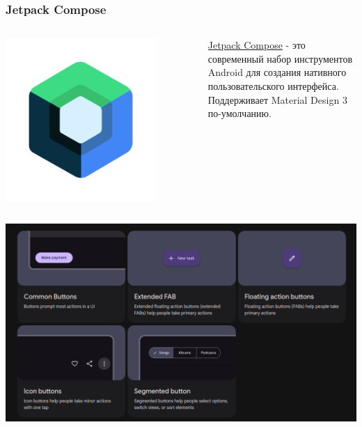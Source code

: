 \documentclass[12pt]{beamer}
\begin{document}
\begin{frame}
\begin{columns}
\begin{column}{0.5\textwidth}
            \end{column}
        \end{columns}
    \end{frame}

    \begin{frame}
        \frametitle{Jetpack Compose}
        \begin{columns}
            \begin{column}{0.5\textwidth}
                \includegraphics[width=0.8\textwidth]{jc.png}
            \end{column}

            \begin{column}{0.5\textwidth}
                \href{https://developer.android.com/compose}{Jetpack Compose}
                - это современный набор инструментов Android
                для создания нативного пользовательского интерфейса. \\

                Поддерживает Material Design 3 по-умолчанию.
            \end{column}
        \end{columns}
    \end{frame}

    \begin{frame}
        \includegraphics[width=1\textwidth]{actions.png}
    \end{frame}
\end{document}
